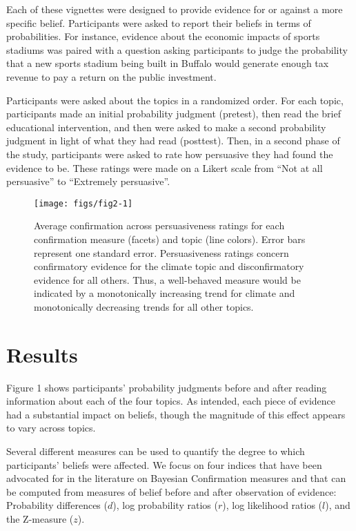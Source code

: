 \documentclass[10pt, letterpaper]{article}
\newenvironment{CodeChunk}{}{}
\begin{document}
Each of these vignettes were designed to provide evidence for or against
a more specific belief. Participants were asked to report their beliefs
in terms of probabilities. For instance, evidence about the economic
impacts of sports stadiums was paired with a question asking
participants to judge the probability that a new sports stadium being
built in Buffalo would generate enough tax revenue to pay a return on
the public investment.

Participants were asked about the topics in a randomized order. For each
topic, participants made an initial probability judgment (pretest), then
read the brief educational intervention, and then were asked to make a
second probability judgment in light of what they had read (posttest).
Then, in a second phase of the study, participants were asked to rate
how persuasive they had found the evidence to be. These ratings were
made on a Likert scale from ``Not at all persuasive'' to ``Extremely
persuasive''.

\begin{CodeChunk}
\begin{figure*}[htb]

{\centering \texttt{[image: figs/fig2-1]} 

}

\caption[Average confirmation across persuasiveness ratings for each confirmation measure (facets) and topic (line colors)]{Average confirmation across persuasiveness ratings for each confirmation measure (facets) and topic (line colors). Error bars represent one standard error. Persuasiveness ratings concern confirmatory evidence for the climate topic and disconfirmatory evidence for all others. Thus, a well-behaved measure would be indicated by a monotonically increasing trend for climate and monotonically decreasing trends for all other topics.}\label{fig:fig2}
\end{figure*}
\end{CodeChunk}

\hypertarget{results}{%
\section{Results}\label{results}}

Figure 1 shows participants' probability judgments before and after
reading information about each of the four topics. As intended, each
piece of evidence had a substantial impact on beliefs, though the
magnitude of this effect appears to vary across topics.

Several different measures can be used to quantify the degree to which
participants' beliefs were affected. We focus on four indices that have
been advocated for in the literature on Bayesian Confirmation measures
and that can be computed from measures of belief before and after
observation of evidence: Probability differences (\(d\)), log
probability ratios (\(r\)), log likelihood ratios (\(l\)), and the
Z-measure (\(z\)).
\end{document}

